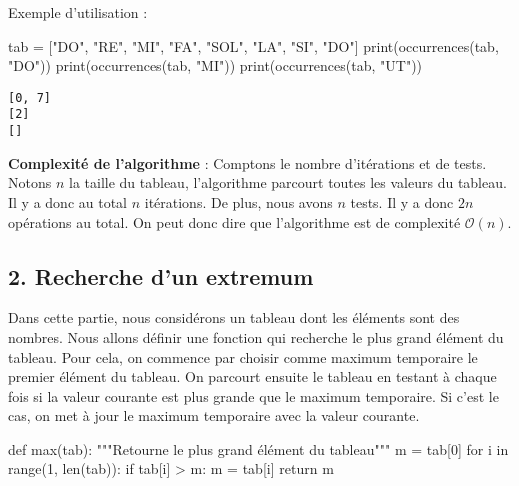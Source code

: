 \documentclass[
  a4paper,
  DIV=11,
  numbers=noendperiod]{scrartcl}
\newenvironment{Shaded}{\begin{snugshade}}{\end{snugshade}}
\newcommand{\BuiltInTok}[1]{\textcolor[rgb]{0.00,0.23,0.31}{#1}}
\newcommand{\CommentTok}[1]{\textcolor[rgb]{0.37,0.37,0.37}{#1}}
\newcommand{\ControlFlowTok}[1]{\textcolor[rgb]{0.00,0.23,0.31}{#1}}
\newcommand{\DecValTok}[1]{\textcolor[rgb]{0.68,0.00,0.00}{#1}}
\newcommand{\KeywordTok}[1]{\textcolor[rgb]{0.00,0.23,0.31}{#1}}
\newcommand{\NormalTok}[1]{\textcolor[rgb]{0.00,0.23,0.31}{#1}}
\newcommand{\OperatorTok}[1]{\textcolor[rgb]{0.37,0.37,0.37}{#1}}
\newcommand{\StringTok}[1]{\textcolor[rgb]{0.13,0.47,0.30}{#1}}
\begin{document}
Exemple d'utilisation :

\begin{Shaded}
\begin{Highlighting}[]
\NormalTok{tab }\OperatorTok{=}\NormalTok{ [}\StringTok{"DO"}\NormalTok{, }\StringTok{"RE"}\NormalTok{, }\StringTok{"MI"}\NormalTok{, }\StringTok{"FA"}\NormalTok{, }\StringTok{"SOL"}\NormalTok{, }\StringTok{"LA"}\NormalTok{, }\StringTok{"SI"}\NormalTok{, }\StringTok{"DO"}\NormalTok{]}
\BuiltInTok{print}\NormalTok{(occurrences(tab, }\StringTok{"DO"}\NormalTok{))}
\BuiltInTok{print}\NormalTok{(occurrences(tab, }\StringTok{"MI"}\NormalTok{))}
\BuiltInTok{print}\NormalTok{(occurrences(tab, }\StringTok{"UT"}\NormalTok{))}
\end{Highlighting}
\end{Shaded}

\begin{verbatim}
[0, 7]
[2]
[]
\end{verbatim}

\textbf{Complexité de l'algorithme} : Comptons le nombre d'itérations et
de tests. Notons \(n\) la taille du tableau, l'algorithme parcourt
toutes les valeurs du tableau. Il y a donc au total \(n\) itérations. De
plus, nous avons \(n\) tests. Il y a donc \(2n\) opérations au total. On
peut donc dire que l'algorithme est de complexité \(\mathcal{O}(n)\).

\hypertarget{recherche-dun-extremum}{%
\subsection{2. Recherche d'un extremum}\label{recherche-dun-extremum}}

Dans cette partie, nous considérons un tableau dont les éléments sont
des nombres. Nous allons définir une fonction qui recherche le plus
grand élément du tableau. Pour cela, on commence par choisir comme
maximum temporaire le premier élément du tableau. On parcourt ensuite le
tableau en testant à chaque fois si la valeur courante est plus grande
que le maximum temporaire. Si c'est le cas, on met à jour le maximum
temporaire avec la valeur courante.

\begin{Shaded}
\begin{Highlighting}[]
\KeywordTok{def} \BuiltInTok{max}\NormalTok{(tab):}
    \CommentTok{"""Retourne le plus grand élément du tableau"""}
\NormalTok{    m }\OperatorTok{=}\NormalTok{ tab[}\DecValTok{0}\NormalTok{]}
    \ControlFlowTok{for}\NormalTok{ i }\KeywordTok{in} \BuiltInTok{range}\NormalTok{(}\DecValTok{1}\NormalTok{, }\BuiltInTok{len}\NormalTok{(tab)):}
        \ControlFlowTok{if}\NormalTok{ tab[i] }\OperatorTok{\textgreater{}}\NormalTok{ m:}
\NormalTok{            m }\OperatorTok{=}\NormalTok{ tab[i]}
    \ControlFlowTok{return}\NormalTok{ m}
\end{Highlighting}
\end{Shaded}
\end{document}
